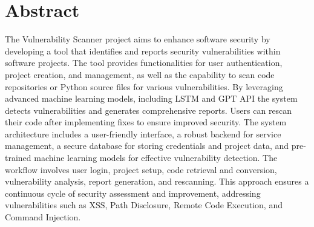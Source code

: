 \chapter*{Abstract}
The Vulnerability Scanner project aims to enhance software security by developing a tool that identifies and reports security vulnerabilities within 
software projects. The tool provides functionalities for user authentication, project creation, and management, as well as the capability to scan 
code repositories or Python source files for various vulnerabilities. 
By leveraging advanced machine learning models, including LSTM and GPT API the system detects vulnerabilities and generates comprehensive reports. Users 
can rescan their code after implementing fixes to ensure improved security. The system architecture includes a user-friendly interface, a robust backend 
for service management, a secure database for storing credentials and project data, and pre-trained machine learning models for effective vulnerability 
detection. The workflow involves user login, project setup, code retrieval and conversion, vulnerability analysis, report generation, and rescanning. 
This approach ensures a continuous cycle of security assessment and improvement, addressing vulnerabilities such as XSS, Path Disclosure, Remote Code 
Execution, and Command Injection.
